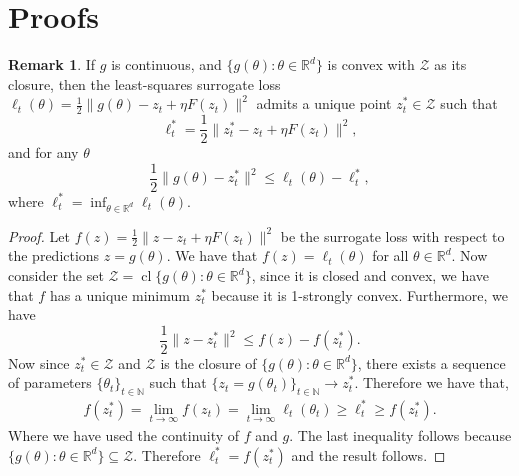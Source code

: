 \documentclass{article} %
\theoremstyle{definition}
\newtheorem{remark}[theorem]{Remark}
\newcommand{\reals}{\mathbb{R}}
\newcommand*\closure[1]{\operatorname{cl}#1}
\newcommand{\nnumbers}{\mathbb{N}}
\begin{document}
\section{Proofs}
\begin{remark}\label{remark:inf}
If $g$ is continuous, and $\{g(\theta): \theta  \in\reals^d\}$ is convex with $\mathcal{Z}$ as its closure, then the least-squares surrogate loss $\ell_t(\theta)=\frac{1}{2}\|g(\theta)-z_{t}+\eta F(z_t)\|^2$ admits a unique point $z_t^\ast \in \mathcal{Z}$ such that
\[
    \ell_t^\ast =  \frac{1}{2}\|z_t^\ast-z_{t}+\eta F(z_t)\|^2,
\]
and for any $\theta$
\[
\frac{1}{2}\|g(\theta) -z_t^\ast\|^2 \leq \ell_t(\theta)-\ell_t^\ast,
\]
where $\ell_t^\ast = \inf_{\theta \in \reals^d} \ell_t(\theta)$.
\end{remark}
\begin{proof}
    Let $f(z) = \frac{1}{2}\|z-z_t+\eta F(z_t)\|^2$ be the surrogate loss with respect to the predictions $z = g(\theta)$.
    We have that $f(z) = \ell_t(\theta)$ for all $\theta \in \reals^d$.
    Now consider the set $\mathcal{Z}=\closure{\{g(\theta): \theta \in \reals^d\}}$, since it is closed and convex, we have that $f$ has a unique minimum $z_t^\ast$ because it is 1-strongly convex. 
    Furthermore, we have
    \[
        \frac{1}{2}\|z-z_t^\ast\|^2 \leq f(z) -f(z_t^\ast).
    \]
    Now since $z_t^\ast \in \mathcal{Z}$ and $\mathcal{Z}$ is the closure of $\{g(\theta): \theta \in  \reals^d\}$, there exists a sequence of parameters $\{\theta_t\}_{t\in \nnumbers}$ such that
    $\{z_t = g(\theta_t)\}_{t\in\nnumbers} \to z_t^\ast$.
    Therefore we have that,
    \begin{align*}
        f(z_t^\ast) = \lim_{t \to \infty} f(z_t) = \lim_{t \to \infty} \ell_t(\theta_t) \geq \ell_t^\ast \geq f(z_t^\ast).
    \end{align*}
    Where we have used the continuity of $f$ and $g$. The last inequality follows because $\{g(\theta): \theta \in  \reals^d\} \subseteq \mathcal{Z}$.
    Therefore $\ell_t^\ast = f(z_t^\ast)$ and the result follows.
\end{proof}
\end{document}
